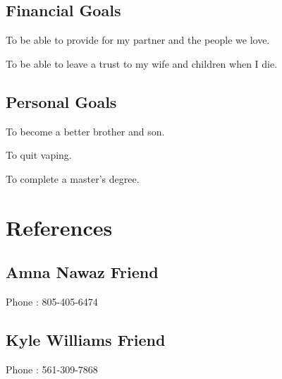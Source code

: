 \documentclass[singlesided, paper=a4, fontsize=10.5pt]{bf-class}
\begin{document}
{    \subsection{Financial Goals}
    \begin{bitemize}
        \item To be able to provide for my partner and the people we love. 
        \item To be able to leave a trust to my wife and children when I die.
    \end{bitemize}

    \subsection{Personal Goals}
    \begin{bitemize}
        \item To become a better brother and son.
        \item To quit vaping.
        \item To complete a master's degree.
    \end{bitemize}

    \section{References}
    \subsection{Amna Nawaz \hfill Friend}
    \begin{zitemize}
    \item Phone : \hfill 805-405-6474
    \end{zitemize}

    \subsection{Kyle Williams \hfill Friend}
    \begin{zitemize}
    \item Phone : \hfill 561-309-7868
    \end{zitemize}

}
\end{document}
